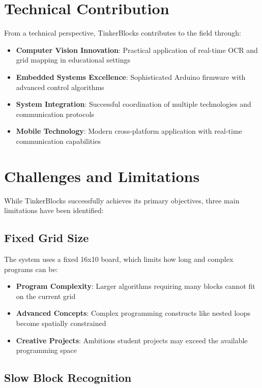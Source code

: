 \section{Technical Contribution}

From a technical perspective, TinkerBlocks contributes to the field through:
\begin{itemize}
    \item \textbf{Computer Vision Innovation}: Practical application of real-time OCR and grid mapping in educational settings
    \item \textbf{Embedded Systems Excellence}: Sophisticated Arduino firmware with advanced control algorithms
    \item \textbf{System Integration}: Successful coordination of multiple technologies and communication protocols
    \item \textbf{Mobile Technology}: Modern cross-platform application with real-time communication capabilities
\end{itemize}

\section{Challenges and Limitations}

While TinkerBlocks successfully achieves its primary objectives, three main limitations have been identified:

\subsection{Fixed Grid Size}

The system uses a fixed 16x10 board, which limits how long and complex programs can be:

\begin{itemize}
    \item \textbf{Program Complexity}: Larger algorithms requiring many blocks cannot fit on the current grid
    \item \textbf{Advanced Concepts}: Complex programming constructs like nested loops become spatially constrained
    \item \textbf{Creative Projects}: Ambitious student projects may exceed the available programming space
\end{itemize}

\subsection{Slow Block Recognition}


